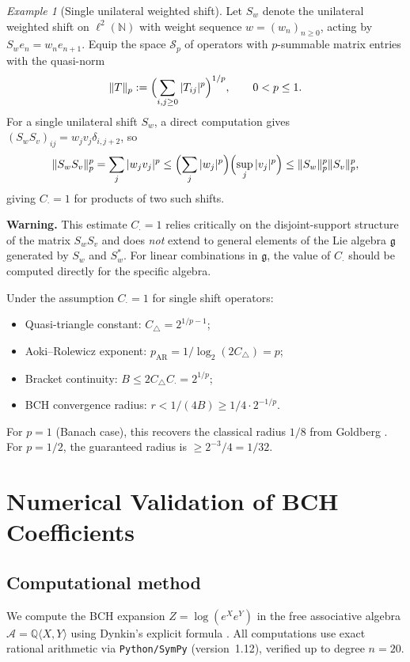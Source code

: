 \documentclass[10pt]{amsart}
\theoremstyle{definition}
\theoremstyle{remark}
\newtheorem{example}[theorem]{Example}
\numberwithin{equation}{section}
\newcommand{\Ctri}{C_{\triangle}}    %
\newcommand{\Cmult}{C_{\cdot}}       %
\newcommand{\Cbracket}{B}            %
\begin{document}
\begin{example}[Single unilateral weighted shift]\label{ex:weighted-shift}
Let $S_w$ denote the unilateral weighted shift on $\ell^2(\mathbb{N})$ with weight
sequence $w=(w_n)_{n\ge 0}$, acting by $S_w e_n = w_n e_{n+1}$.  Equip the space
$\mathcal{S}_p$ of operators with $p$-summable matrix entries with the quasi-norm
\[
  \|T\|_p := \Bigl(\sum_{i,j\ge 0} |T_{ij}|^p\Bigr)^{1/p}, \qquad 0<p\le 1.
\]
For a single unilateral shift $S_w$, a direct computation gives
$(S_w S_v)_{ij} = w_j v_j \delta_{i,j+2}$, so
\[
  \|S_w S_v\|_p^p = \sum_j |w_j v_j|^p \le \Bigl(\sum_j|w_j|^p\Bigr)\Bigl(\sup_j|v_j|^p\Bigr)
  \le \|S_w\|_p^p \|S_v\|_p^p,
\]
giving $\Cmult = 1$ for products of two such shifts.

\textbf{Warning.}
This estimate $\Cmult = 1$ relies critically on the disjoint-support structure of the
matrix $S_w S_v$ and does \emph{not} extend to general elements of the Lie algebra
$\mathfrak{g}$ generated by $S_w$ and $S_w^*$.  For linear combinations in $\mathfrak{g}$,
the value of $\Cmult$ should be computed directly for the specific algebra.

Under the assumption $\Cmult = 1$ for single shift operators:
\begin{itemize}
    \item Quasi-triangle constant: $\Ctri = 2^{1/p - 1}$;
    \item Aoki--Rolewicz exponent: $p_{\mathrm{AR}} = 1/\log_2(2\Ctri) = p$;
    \item Bracket continuity: $\Cbracket \le 2\Ctri\Cmult = 2^{1/p}$;
    \item BCH convergence radius: $r < 1/(4\Cbracket) \ge 1/4 \cdot 2^{-1/p}$.
\end{itemize}
For $p=1$ (Banach case), this recovers the classical radius $1/8$ from Goldberg
\cite{Goldberg1956}.  For $p=1/2$, the guaranteed radius is $\ge 2^{-3}/4 = 1/32$.
\end{example}

\section{Numerical Validation of BCH Coefficients}\label{sec:numerical}

\subsection{Computational method}

We compute the BCH expansion $Z = \log(e^X e^Y)$ in the free associative algebra
$\mathcal{A} = \mathbb{Q}\langle X,Y\rangle$ using Dynkin's explicit formula
\cite{Dynkin1947}.  All computations use exact rational arithmetic via
\texttt{Python/SymPy} (version~1.12), verified up to degree $n=20$.
\end{document}
